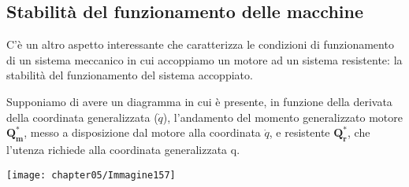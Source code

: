 \subsection{Stabilità del funzionamento delle macchine}

C'è un altro aspetto interessante che caratterizza le condizioni di funzionamento di un sistema meccanico in cui accoppiamo un motore ad un sistema resistente: la stabilità del funzionamento del sistema accoppiato.

Supponiamo di avere un diagramma in cui è presente, in funzione della derivata della coordinata generalizzata ($\dot{q}$), l'andamento del momento generalizzato motore $\mathbf{Q^*_m}$, messo a disposizione dal motore alla coordinata $\dot{q}$, e resistente $\mathbf{Q^*_r}$, che l'utenza richiede alla coordinata generalizzata q.

\begin{center}
\texttt{[image: chapter05/Immagine157]}
\end{center}

